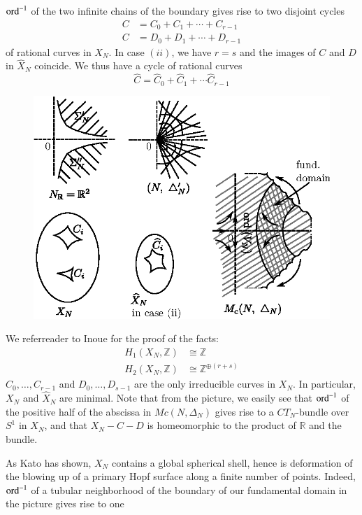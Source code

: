$\operatorname{ord}^{-1}$ of the two infinite chains of the boundary gives rise to 
two disjoint cycles  
\begin{align*}
C & = C_0+ C_1 + \cdots + C_{r-1} \\
C & = D_0+ D_1 + \cdots + D_{r-1}
\end{align*}
of rational curves in $X_N$. In case $(ii)$, we have $ r = s $ and the
images of $C$ and $D$ in $\hat{X}_N$ coincide. We thus have a cycle of
rational curves  
$$
\hat{C}= \hat{C}_0 + \hat{C}_1 + \cdots \hat{C}_{r-1} 
$$
\begin{figure}[H]
\centering 
\includegraphics{vol58-fig/fig58-81.eps} 
\end{figure}

We refer\pageoriginale reader to Inoue \cite{keyI3} for the proof of the
facts:  
\begin{align*}
 H_1(X_N, \mathbb{Z}) & \cong \mathbb{Z}\\
 H_2(X_N, \mathbb{Z}) & \cong \mathbb{Z}^{\oplus (r+s)}
\end{align*}
$C_0, \ldots , C_{r-1}$ and $D_0, \ldots , D_{s-1}$ are the only
irreducible curves in $X_N$. In particular, $X_N$ and $\hat{X}_N$ are
minimal. 
Note that from the picture, we easily see that $\operatorname{ord}^{-1}$ of the
positive half of the abscissa in $Mc(N, \Delta_N)$ gives rise to a
$CT_N$-bundle over $S^1$ in $X_N$, and that $X_N -C-D$ is homeomorphic
to the product of $\mathbb{R}$ and the bundle. 

\begin{remark*}
As Kato \cite{keyK2} has shown, $X_N$ contains a global spherical shell,
hence is deformation of the blowing up of a primary Hopf surface along
a finite number of points. Indeed, $\operatorname{ord}^{-1}$ of a tubular
neighborhood of the boundary of our fundamental domain in the picture
gives rise to one 
\end{remark*}

